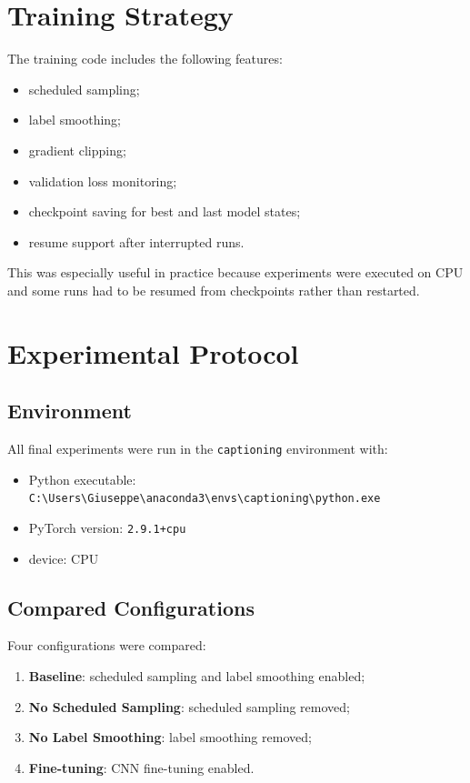 \documentclass[11pt,a4paper]{article}
\begin{document}
\section{Training Strategy}

The training code includes the following features:
\begin{itemize}[leftmargin=*]
    \item scheduled sampling;
    \item label smoothing;
    \item gradient clipping;
    \item validation loss monitoring;
    \item checkpoint saving for best and last model states;
    \item resume support after interrupted runs.
\end{itemize}

This was especially useful in practice because experiments were executed on CPU and some runs had to be resumed from checkpoints rather than restarted.

\section{Experimental Protocol}

\subsection{Environment}

All final experiments were run in the \texttt{captioning} environment with:
\begin{itemize}[leftmargin=*]
    \item Python executable: \texttt{C:\textbackslash Users\textbackslash Giuseppe\textbackslash anaconda3\textbackslash envs\textbackslash captioning\textbackslash python.exe}
    \item PyTorch version: \texttt{2.9.1+cpu}
    \item device: CPU
\end{itemize}

\subsection{Compared Configurations}

Four configurations were compared:
\begin{enumerate}[leftmargin=*]
    \item \textbf{Baseline}: scheduled sampling and label smoothing enabled;
    \item \textbf{No Scheduled Sampling}: scheduled sampling removed;
    \item \textbf{No Label Smoothing}: label smoothing removed;
    \item \textbf{Fine-tuning}: CNN fine-tuning enabled.
\end{enumerate}
\end{document}
